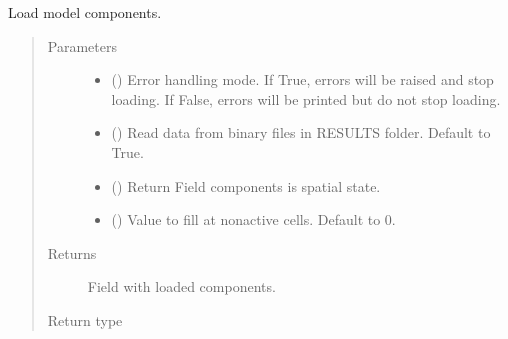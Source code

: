 \documentclass[letterpaper,10pt,english]{sphinxmanual}
\begin{document}
\begin{fulllineitems}
\begin{fulllineitems}
\label{\detokenize{api/field:geology.src.Field.load}}
Load model components.
\begin{quote}\begin{description}
\item[{Parameters}] \leavevmode\begin{itemize}
\item {} 
 () \textendash{} Error handling mode. If True, errors will be raised and stop loading.
If False, errors will be printed but do not stop loading.

\item {} 
 () \textendash{} Read data from binary files in RESULTS folder. Default to True.

\item {} 
 () \textendash{} Return Field components is spatial state.

\item {} 
 () \textendash{} Value to fill at non\sphinxhyphen{}active cells. Default to 0.

\end{itemize}

\item[{Returns}] \leavevmode
{} \textendash{} Field with loaded components.

\item[{Return type}] \leavevmode
{\hyperref[\detokenize{api/field:geology.src.Field}]{}}

\end{description}\end{quote}

\end{fulllineitems}


\end{fulllineitems}
\end{document}
